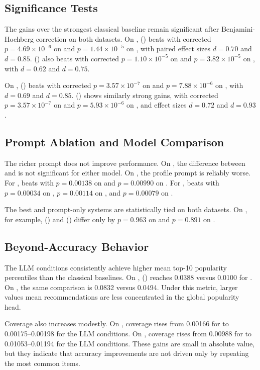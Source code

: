 \subsection{Significance Tests}

 The gains over the strongest classical baseline remain significant after Benjamini-Hochberg correction on both datasets. On \lastfm, \gptfourone (\minimalprompt) beats \coocbaseline with corrected $p=4.69\times10^{-6}$ on \mrr and $p=1.44\times10^{-5}$ on \ndcg, with paired effect sizes $d=0.70$ and $d=0.85$. \claudesonnet (\minimalprompt) also beats \coocbaseline with corrected $p=1.10\times10^{-5}$ on \mrr and $p=3.82\times10^{-5}$ on \ndcg, with $d=0.62$ and $d=0.75$.

On \mpd, \gptfourone (\minimalprompt) beats \coocbaseline with corrected $p=3.57\times10^{-7}$ on \mrr and $p=7.88\times10^{-6}$ on \ndcg, with $d=0.69$ and $d=0.85$. \claudesonnet (\minimalprompt) shows similarly strong gains, with corrected $p=3.57\times10^{-7}$ on \mrr and $p=5.93\times10^{-6}$ on \ndcg, and effect sizes $d=0.72$ and $d=0.93$.

\subsection{Prompt Ablation and Model Comparison}

 The richer \profileprompt prompt does not improve performance. On \lastfm, the difference between \minimalprompt and \profileprompt is not significant for either model. On \mpd, the profile prompt is reliably worse. For \claudesonnet, \minimalprompt beats \profileprompt with $p=0.00138$ on \mrr and $p=0.00990$ on \ndcg. For \gptfourone, \minimalprompt beats \profileprompt with $p=0.00034$ on \mrr, $p=0.00114$ on \ndcg, and $p=0.00079$ on \hitten.

 The best \gptfourone and \claudesonnet prompt-only systems are statistically tied on both datasets. On \mpd, for example, \gptfourone (\minimalprompt) and \claudesonnet (\minimalprompt) differ only by $p=0.963$ on \mrr and $p=0.891$ on \ndcg.

\subsection{Beyond-Accuracy Behavior}

 The LLM conditions consistently achieve higher mean top-10 popularity percentiles than the classical baselines. On \lastfm, \gptfourone (\minimalprompt) reaches 0.0388 versus 0.0100 for \coocbaseline. On \mpd, the same comparison is 0.0832 versus 0.0494. Under this metric, larger values mean recommendations are less concentrated in the global popularity head.

 Coverage also increases modestly. On \lastfm, coverage rises from 0.00166 for \coocbaseline to 0.00175--0.00198 for the LLM conditions. On \mpd, coverage rises from 0.00988 for \coocbaseline to 0.01053--0.01194 for the LLM conditions. These gains are small in absolute value, but they indicate that accuracy improvements are not driven only by repeating the most common items.
